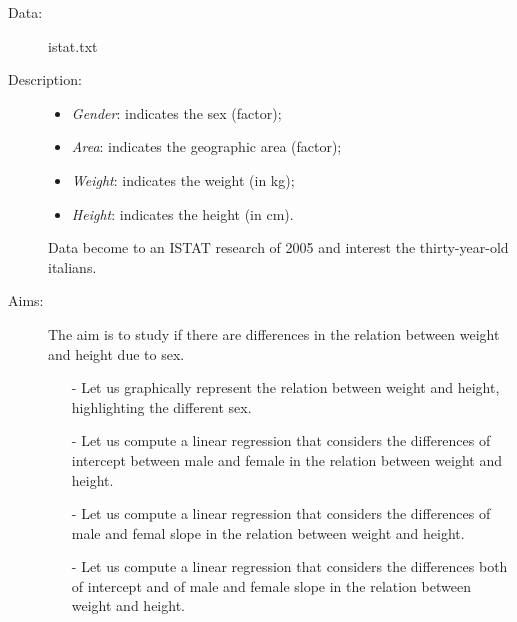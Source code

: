 
\begin{frame}
  \begin{description}
    \item[Data: ]istat.txt \\ 
    \item[Description: ]
      \begin{footnotesize}
        \begin{itemize}
          \item \textit{Gender}: indicates the sex (factor);
          \item \textit{Area}: indicates the geographic area (factor);
          \item \textit{Weight}: indicates the weight (in kg);
          \item \textit{Height}: indicates the height (in cm).
        \end{itemize}
      \end{footnotesize}
      \begin{tiny}
         Data become to an ISTAT research of 2005 and interest the thirty-year-old italians.
      \end{tiny}
    \item[Aims: ]
      \begin{footnotesize}
        The aim is to study if there are differences in the relation between weight and height due to sex.
       \begin{itemize}
          \item[-] Let us graphically represent the relation between weight and height, highlighting the different sex.
          \item[-] Let us compute a linear regression that considers the differences of intercept between male and female in the relation between weight and height.
          \item[-] Let us compute a linear regression that considers the differences of male and femal slope in the relation between weight and height.
          \item[-] Let us compute a linear regression that considers the differences both of intercept and of male and female slope in the relation between weight and height.
        \end{itemize}
      \end{footnotesize}
  \end{description}
\end{frame}

